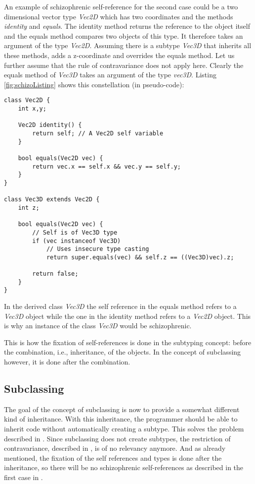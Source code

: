 An example of schizophrenic self-reference for the second case could be
a two dimensional vector type \emph{Vec2D} which has two coordinates
and the methods \emph{identity} and \emph{equals}. The identity method
returns the reference to the object itself and the equals method
compares two objects of this type. It therefore takes an argument
of the type \emph{Vec2D}. Assuming there is a subtype \emph{Vec3D}
that inherits all these methods, adds a z-coordinate and overrides the
equals method. Let us further assume that the rule of contravariance
does not apply here. Clearly the equals method of \emph{Vec3D} takes
an argument of the type \emph{vec3D}. Listing \ref{fig:schizoListing}
shows this constellation (in pseudo-code):

\begin{lstlisting}[float,caption={An example of schizophrenic self-reference},label={fig:schizoListing}]
class Vec2D {
	int x,y;

	Vec2D identity() {
		return self; // A Vec2D self variable
	}

	bool equals(Vec2D vec) {
		return vec.x == self.x && vec.y == self.y;
	}
}

class Vec3D extends Vec2D {
	int z;

	bool equals(Vec2D vec) {
		// Self is of Vec3D type
		if (vec instanceof Vec3D)
			// Uses insecure type casting
			return super.equals(vec) && self.z == ((Vec3D)vec).z;

		return false;
	}
}
\end{lstlisting}

In the derived class \emph{Vec3D} the self reference in the equals 
method refers to a \emph{Vec3D} object while the one in the identity method
refers to a \emph{Vec2D} object. This is why an instance of the class
\emph{Vec3D} would be schizophrenic.

This is how the fixation of self-references is done in the subtyping
concept: before the combination, i.e., inheritance, of the objects. In the
concept of subclassing however, it is done after the combination.

\subsection{Subclassing} 
The goal of the concept of subclassing is now to provide a somewhat
different kind of inheritance. With this inheritance, the programmer
should be able to inherit code without automatically creating a subtype.
This solves the problem described in . Since
subclassing does not create subtypes, the restriction of contravariance,
described in , is of no relevancy
anymore. And as already mentioned, the fixation of the self references
and types is done after the inheritance, so there will be no schizophrenic
self-references as described in the first case in .  
\\

